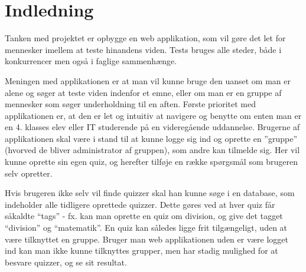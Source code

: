 \chapter{Indledning}
Tanken med projektet er opbygge en web applikation, som vil gøre det let for mennesker imellem at teste hinandens viden. Tests bruges alle steder, både i konkurrencer men også i faglige sammenhænge. 

Meningen med applikationen er at man vil kunne bruge den uanset om man er alene og søger at teste viden indenfor et emne, eller om man er en gruppe af mennesker som søger underholdning til en aften. 
Første prioritet med applikationen er, at den er let og intuitiv at navigere og benytte om enten man er en 4. klasses elev eller IT studerende på en videregående uddannelse. 
Brugerne af applikationen skal være i stand til at kunne logge sig ind og oprette en ''gruppe'' (hvorved de bliver administrator af gruppen), som andre kan tilmelde sig. Her vil kunne oprette sin egen quiz, og herefter tilføje en række spørgsmål som brugeren selv opretter. 

Hvis brugeren ikke selv vil finde quizzer skal han kunne søge i en database, som indeholder alle tidligere oprettede quizzer. Dette gøres ved at hver quiz får såkaldte “tags” - fx. kan man oprette en quiz om division, og give det tagget “division” og “matematik”. En quiz kan således ligge frit tilgængeligt, uden at være tilknyttet en gruppe. Bruger man web applikationen uden er være logget ind kan man ikke kunne tilknyttes grupper, men har stadig mulighed for at besvare quizzer, og se sit resultat.



